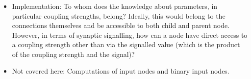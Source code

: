 \begin{itemize}
	\item Implementation: To whom does the knowledge about parameters, in particular coupling strengths, belong? Ideally, this would belong to the connections themselves and be accessible to both child and parent node. However, in terms of synaptic signalling, how can a node have direct access to a coupling strength other than via the signalled value (which is the product of the coupling strength and the signal)?

	\item Not covered here: Computations of input nodes and binary input nodes.
\end{itemize}